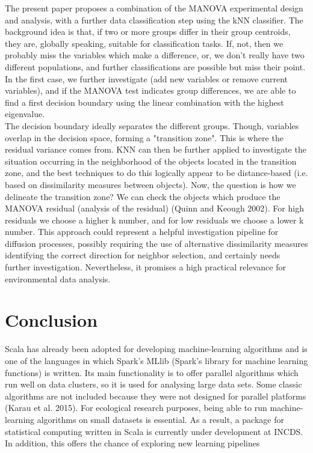 \documentclass[journal]{IEEEtran}
\begin{document}
The present paper proposes a combination of the MANOVA experimental design and analysis, with a further data classification step using the kNN classifier. 
The background idea is that, if two or more groups differ in their group centroids, they are, globally speaking, suitable for classification tasks. If, not, then we probably miss the variables which make a difference, or, we don't really have two different populations, and further classifications are possible but miss their point.
In the first case, we further investigate (add new variables or remove current variables), and if the MANOVA test indicates group differences, we are able to find a first decision boundary using the linear combination with the highest eigenvalue.\\


 The decision boundary ideally separates the different groups.
 Though, variables overlap in the decision space, forming a "transition zone". This is where the residual variance comes from. 
KNN can then be further applied to investigate the situation occurring in the neighborhood of the objects located in the transition zone, and the best techniques to do this logically appear to be distance-based (i.e. based on dissimilarity measures between objects). 
Now, the question is how we delineate the transition zone? We can check the objects which produce the MANOVA residual (analysis of the residual) (Quinn and Keough 2002).        
For high residuals we choose a higher k number, and for low residuals we choose a lower k number. This approach could represent a helpful investigation pipeline for diffusion processes, possibly requiring the use of alternative dissimilarity measures identifying the correct direction for neighbor selection, and certainly needs further investigation. 
 Nevertheless, it promises a high practical relevance for environmental data analysis.
   

\section{Conclusion}

Scala has already been adopted for developing machine-learning algorithms and is one of the languages in which Spark's MLlib (Spark's library for machine learning functions) is written. 
Its main functionality is to offer parallel algorithms which run well on data clusters, so it is used for analysing large data sets. Some classic algorithms are not included because they were not designed for parallel platforms (Karau et al. 2015).  
For ecological research purposes, being able to run machine-learning algorithms on small datasets is essential. As a result, a package for statistical computing written in Scala is currently under development at INCDS.
In addition, this offers the chance of exploring new learning pipelines 
     
\end{document}
